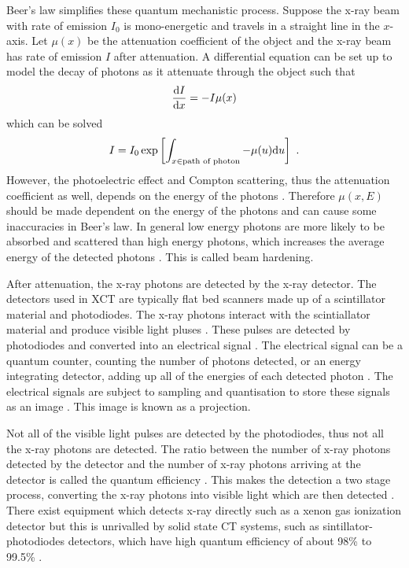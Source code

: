 Beer's law simplifies these quantum mechanistic process. Suppose the x-ray beam with rate of emission $I_0$ is mono-energetic and travels in a straight line in the $x$-axis. Let $\mu(x)$ be the attenuation coefficient of the object and the x-ray beam has rate of emission $I$ after attenuation. A differential equation can be set up to model the decay of photons as it attenuate through the object such that
\begin{equation}
\dfrac{\mathrm{d} I}{\mathrm{d} x} = -I\mu(x)
\end{equation}
which can be solved
\begin{equation}
I = I_0\exp\left[\int_{x \in \text{path of photon}}-\mu(u)\mathrm{d} u\right] \ .
\label{eq:beerLaw}
\end{equation}
However, the photoelectric effect and Compton scattering, thus the attenuation coefficient as well, depends on the energy of the photons \citep{elbakri2002statistical}. Therefore $\mu(x,E)$ should be made dependent on the energy of the photons \citep{cantatore2011introduction} and can cause some inaccuracies in Beer's law. In general low energy photons are more likely to be absorbed and scattered than high energy photons, which increases the average energy of the detected photons \citep{sun2012overview}. This is called beam hardening.

After attenuation, the x-ray photons are detected by the x-ray detector. The detectors used in XCT are typically flat bed scanners made up of a scintillator material \citep{curran1953luminescence, greskovich1997ceramic} and photodiodes. The x-ray photons interact with the scintiallator material and produce visible light pluses \citep{rossner1993conversion}. These pulses are detected by photodiodes and converted into an electrical signal \citep{nikl2006scintillation, ren2018tutorial}. The electrical signal can be a quantum counter, counting the number of photons detected, or an energy integrating detector, adding up all of the energies of each detected photon \citep{nikl2006scintillation, whiting2006properties, kruth2011computed, ren2018tutorial}. The electrical signals are subject to sampling and quantisation to store these signals as an image \citep{cierniak2011x}. This image is known as a projection.

Not all of the visible light pulses are detected by the photodiodes, thus not all the x-ray photons are detected. The ratio between the number of x-ray photons detected by the detector and the number of x-ray photons arriving at the detector is called the quantum efficiency \citep{cierniak2011x, ren2018tutorial}. This makes the detection a two stage process, converting the x-ray photons into visible light which are then detected \citep{cierniak2011x}. There exist equipment which detects x-ray directly such as a xenon gas ionization detector \citep{fuchs2000direct} but this is unrivalled by solid state CT systems, such as sintillator-photodiodes detectors, which have high quantum efficiency of about 98\% to 99.5\% \citep{hsieh2000investigation}.

